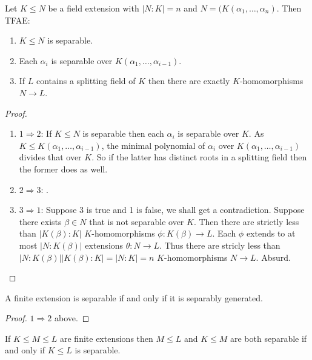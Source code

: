 \documentclass[a4paper]{article}
\begin{document}
\begin{theorem}
  Let \(K \leq N\) be a field extension with \(|N:K| = n\) and \(N = (K(\alpha_1, \dots, \alpha_n)\). Then TFAE:
  \begin{enumerate}
  \item \(K \leq N\) is separable.
  \item Each \(\alpha_i\) is separable over \(K(\alpha_1, \dots, \alpha_{i - 1})\).
  \item If \(L\) contains a splitting field of \(K\) then there are exactly \(K\)-homomorphisms \(N \to L\).
  \end{enumerate}
\end{theorem}

\begin{proof}\leavevmode
  \begin{enumerate}
  \item \(1 \Rightarrow 2\): If \(K \leq N\) is separable then each \(\alpha_i\) is separable over \(K\). As \(K \leq K(\alpha_1, \dots, \alpha_{i - 1})\), the minimal polynomial of \(\alpha_i\) over \(K(\alpha_1, \dots, \alpha_{i - 1})\) divides that over \(K\). So if the latter has distinct roots in a splitting field then the former does as well.
  \item \(2 \Rightarrow 3\): .
  \item \(3 \Rightarrow 1\): Suppose 3 is true and 1 is false, we shall get a contradiction. Suppose there exists \(\beta \in N\) that is not separable over \(K\). Then there are strictly less than \(|K(\beta):K|\) \(K\)-homomorphisms \(\phi: K(\beta) \to L\). Each \(\phi\) extends to at most \(|N:K(\beta)|\) extensions \(\theta: N \to L\). Thus there are stricly less than \(|N:K(\beta)||K(\beta):K| = |N:K| = n\) \(K\)-homomorphisms \(N \to L\). Absurd.
  \end{enumerate}
\end{proof}

\begin{corollary}
  A finite extension is separable if and only if it is separably generated.
\end{corollary}

\begin{proof}
  \(1 \Rightarrow 2\) above.
\end{proof}

\begin{lemma}
  If \(K \leq M \leq L\) are finite extensions then \(M \leq L\) and \(K \leq M\) are both separable if and only if \(K \leq L\) is separable.
\end{lemma}
\end{document}

